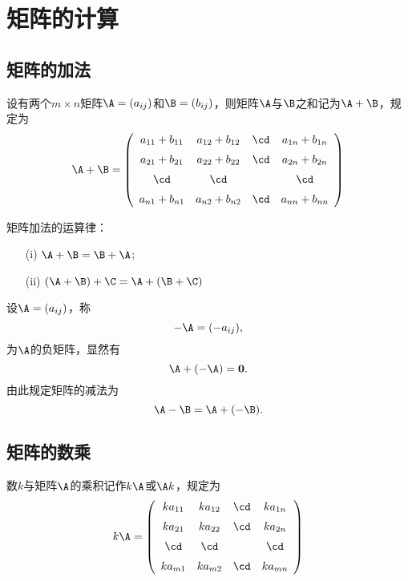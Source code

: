 \section{矩阵的计算}
\subsection{矩阵的加法}
\begin{dingyi}[矩阵的加法]
  设有两个$m\times n$矩阵$\A=(a_{ij})$和$\B=(b_{ij})$，则矩阵$\A$与$\B$之和记为$\A+\B$，规定为
  $$
  \A + \B = 
  \left(
    \begin{array}{cccc}
      a_{11} + b_{11}  & a_{12} + b_{12}  & \cd & a_{1n} + b_{1n}  \\[0.2cm]
      a_{21} + b_{21}  & a_{22} + b_{22}  & \cd & a_{2n} + b_{2n}  \\[0.2cm]
      \cd            & \cd            &     & \cd            \\[0.2cm]
      a_{n1} + b_{n1}  & a_{n2} + b_{n2}  & \cd & a_{nn} + b_{nn}  
    \end{array}
  \right)
  $$
\end{dingyi}

\begin{zhu*}
\end{zhu*}

矩阵加法的运算律：
\begin{itemize}
\item[(i)] $\A + \B = \B + \A$;
\item[(ii)] $(\A + \B) + \C = \A + (\B + \C)$ 
\end{itemize}

设$\A = (a_{ij})$，称
$$
-\A = (-a_{ij}),
$$
为$\A$的负矩阵，显然有
$$
\A + (-\A) = \mathbf{0}.
$$
由此规定矩阵的减法为
$$
\A - \B = \A + (-\B).
$$

\subsection{矩阵的数乘}

% 
\begin{dingyi}[矩阵的数乘]
  数$k$与矩阵$\A$的乘积记作$k \A$或$\A k$，规定为
  $$
  k \A = 
  \left(
    \begin{array}{cccc}
      k a_{11}   & k a_{12}   & \cd & k a_{1n}  \\[0.2cm]
      k a_{21}   & k a_{22}   & \cd & k a_{2n}  \\[0.2cm]
      \cd     & \cd     &     & \cd    \\[0.2cm]
      k a_{m1}   & k a_{m2}   & \cd & k a_{mn}  
    \end{array}
  \right)
  $$
\end{dingyi}

